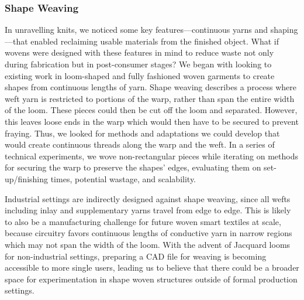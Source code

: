 \subsubsection{Shape Weaving}
In unravelling knits, we noticed some key features---continuous yarns and shaping---that enabled reclaiming usable materials from the finished object. What if wovens were designed with these features in mind to reduce waste not only during fabrication but in post-consumer stages? We began with looking to existing work in loom-shaped and fully fashioned woven garments to create shapes from continuous lengths of yarn.
Shape weaving describes a process where weft yarn is restricted to portions of the warp, rather than span the entire width of the loom. These pieces could then be cut off the loom and separated. However, this leaves loose ends in the warp which would then have to be secured to prevent fraying. Thus, we looked for methods and adaptations we could develop that would create continuous threads along the warp and the weft. In a series of technical experiments, we wove non-rectangular pieces while iterating on methods for securing the warp to preserve the shapes' edges, evaluating them on set-up/finishing times, potential wastage, and scalability. 

Industrial settings are indirectly designed against shape weaving, since all wefts including inlay and supplementary yarns travel from edge to edge. %
This is likely to also be a manufacturing challenge for future woven smart textiles at scale, because circuitry favors continuous lengths of conductive yarn in narrow regions which may not span the width of the loom. With the advent of Jacquard looms for non-industrial settings, preparing a CAD file for weaving is becoming accessible to more single users, leading us to believe that there could be a broader space for experimentation in shape woven structures outside of formal production settings. 

